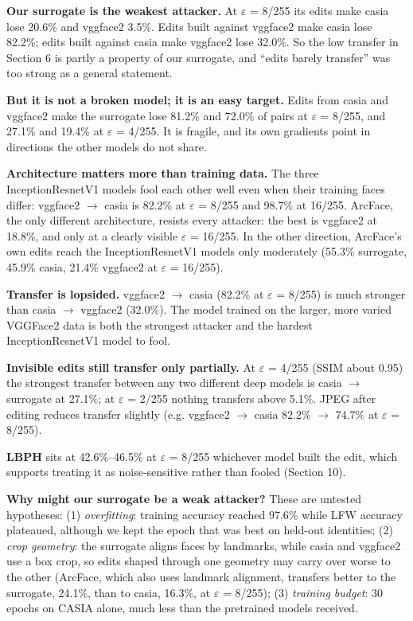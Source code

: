 \documentclass[10pt,a4paper]{article}
\begin{document}
\textbf{Our surrogate is the weakest attacker.} At $\varepsilon$ = 8/255 its edits make casia lose 20.6\% and vggface2 3.5\%. Edits built against vggface2 make casia lose 82.2\%; edits built against casia make vggface2 lose 32.0\%. So the low transfer in Section 6 is partly a property of our surrogate, and ``edits barely transfer'' was too strong as a general statement.


\textbf{But it is not a broken model; it is an easy target.} Edits from casia and vggface2 make the surrogate lose 81.2\% and 72.0\% of pairs at $\varepsilon$ = 8/255, and 27.1\% and 19.4\% at $\varepsilon$ = 4/255. It is fragile, and its own gradients point in directions the other models do not share.


\textbf{Architecture matters more than training data.} The three InceptionResnetV1 models fool each other well even when their training faces differ: vggface2 $\to$ casia is 82.2\% at $\varepsilon$ = 8/255 and 98.7\% at 16/255. ArcFace, the only different architecture, resists every attacker: the best is vggface2 at 18.8\%, and only at a clearly visible $\varepsilon$ = 16/255. In the other direction, ArcFace's own edits reach the InceptionResnetV1 models only moderately (55.3\% surrogate, 45.9\% casia, 21.4\% vggface2 at $\varepsilon$ = 16/255).


\textbf{Transfer is lopsided.} vggface2 $\to$ casia (82.2\% at $\varepsilon$ = 8/255) is much stronger than casia $\to$ vggface2 (32.0\%). The model trained on the larger, more varied VGGFace2 data is both the strongest attacker and the hardest InceptionResnetV1 model to fool.


\textbf{Invisible edits still transfer only partially.} At $\varepsilon$ = 4/255 (SSIM about 0.95) the strongest transfer between any two different deep models is casia $\to$ surrogate at 27.1\%; at $\varepsilon$ = 2/255 nothing transfers above 5.1\%. JPEG after editing reduces transfer slightly (e.g. vggface2 $\to$ casia 82.2\% $\to$ 74.7\% at $\varepsilon$ = 8/255).


\textbf{LBPH} sits at 42.6\%--46.5\% at $\varepsilon$ = 8/255 whichever model built the edit, which supports treating it as noise-sensitive rather than fooled (Section 10).


\textbf{Why might our surrogate be a weak attacker?} These are untested hypotheses: (1) \emph{overfitting}: training accuracy reached 97.6\% while LFW accuracy plateaued, although we kept the epoch that was best on held-out identities; (2) \emph{crop geometry}: the surrogate aligns faces by landmarks, while casia and vggface2 use a box crop, so edits shaped through one geometry may carry over worse to the other (ArcFace, which also uses landmark alignment, transfers better to the surrogate, 24.1\%, than to casia, 16.3\%, at $\varepsilon$ = 8/255); (3) \emph{training budget}: 30 epochs on CASIA alone, much less than the pretrained models received.
\end{document}
